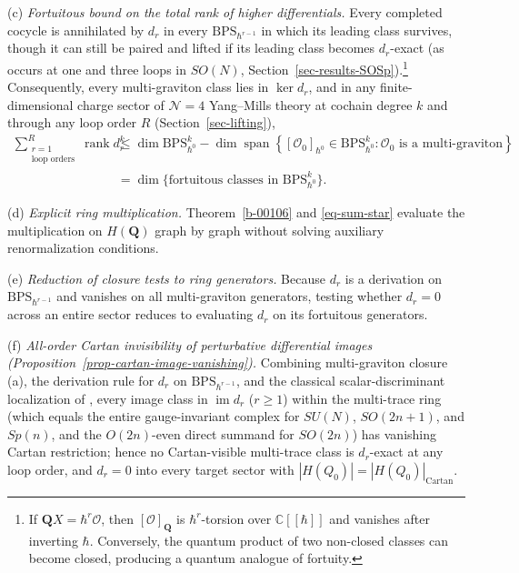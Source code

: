 \documentclass[11pt]{article}
\numberwithin{equation}{section}
\numberwithin{figure}{section}
\numberwithin{table}{section}
\newcommand{\HQ}{|H(Q_0)|}
\newcommand{\HQC}{|H(Q_0)|_{\mathrm{Cartan}}}
\begin{document}
(c) \emph{Fortuitous bound on the total rank of higher differentials.} Every completed cocycle is annihilated by $d_r$ in every $\mathrm{BPS}_{\hbar^{r-1}}$ in which its leading class survives, though it can still be paired and lifted if its leading class becomes $d_r$-exact (as occurs at one and three loops in $SO(N)$, Section~\ref{sec-results-SOSp}).\footnote{If $\mathbf QX=\hbar^r\mathcal O$, then $[\mathcal O]_{\mathbf Q}$ is $\hbar^r$-torsion over $\mathbb C[[\hbar]]$ and vanishes after inverting $\hbar$. Conversely, the quantum product of two non-closed classes can become closed, producing a quantum analogue of fortuity.} Consequently, every multi-graviton class lies in $\ker d_r$, and in any finite-dimensional charge sector of $\mathcal N=4$ Yang--Mills theory at cochain degree $k$ and through any loop order $R$ (Section~\ref{sec-lifting}),
\begin{equation}\label{eq-sum-rank}
\begin{aligned}
\sum_{\substack{r=1\\\text{loop orders}}}^{R}\operatorname{rank}d_r^k
&\le\dim\mathrm{BPS}_{\hbar^0}^k-
\dim\operatorname{span}\left\{[\mathcal O_0]_{\hbar^0}\in\mathrm{BPS}_{\hbar^0}^k:\mathcal O_0\text{ is a multi-graviton}\right\}\\
&=\dim\{\text{fortuitous classes in }\mathrm{BPS}_{\hbar^0}^k\}.
\end{aligned}
\end{equation}

(d) \emph{Explicit ring multiplication.} Theorem~\ref{b-00106} and \eqref{eq-sum-star} evaluate the multiplication on $H(\mathbf Q)$ graph by graph without solving auxiliary renormalization conditions.

(e) \emph{Reduction of closure tests to ring generators.} Because $d_r$ is a derivation on $\mathrm{BPS}_{\hbar^{r-1}}$ and vanishes on all multi-graviton generators, testing whether $d_r=0$ across an entire sector reduces to evaluating $d_r$ on its fortuitous generators.

(f) \emph{All-order Cartan invisibility of perturbative differential images (Proposition~\ref{prop-cartan-image-vanishing}).} Combining multi-graviton closure (a), the derivation rule for $d_r$ on $\mathrm{BPS}_{\hbar^{r-1}}$, and the classical scalar-discriminant localization of \cite[Section 6.2]{KvLM}, every image class in $\operatorname{im}d_r$ ($r\ge1$) within the multi-trace ring (which equals the entire gauge-invariant complex for $SU(N)$, $SO(2n+1)$, and $Sp(n)$, and the $O(2n)$-even direct summand for $SO(2n)$) has vanishing Cartan restriction; hence no Cartan-visible multi-trace class is $d_r$-exact at any loop order, and $d_r=0$ into every target sector with $\HQ=\HQC$.
\end{document}
